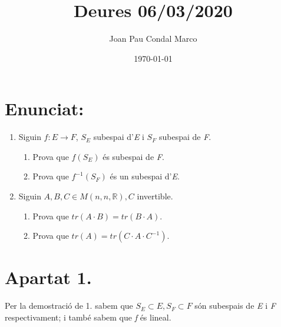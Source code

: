 \documentclass[a4paper, 11pt]{article}
\title{Deures 06/03/2020}
\author{Joan Pau Condal Marco}
\date{\today}
\begin{document}
    \maketitle

    \section*{Enunciat:}
    \begin{enumerate}
        \item Siguin ${f:E\longrightarrow F}$, ${S_E}$ subespai d'\emph{E} i ${S_F}$ subespai de \emph{F}.
        \begin{enumerate}
            \item Prova que ${f(S_E)}$ \'es subespai de \emph{F}.
            \item Prova que ${f^{-1}(S_F)}$ \'es un subespai d'\emph{E}.
        \end{enumerate}
        \item Siguin ${A, B, C \in M(n,n,\mathbb{R}), C}$ invertible.
        \begin{enumerate}
            \item Prova que ${tr(A\cdot B) = tr(B\cdot A)}$.
            \item Prova que ${tr(A) = tr(C\cdot A \cdot C^{-1})}$.
        \end{enumerate}
    \end{enumerate}

    \section*{Apartat 1.}
        Per la demostraci\'o de 1. sabem que ${S_E \subset E, S_F \subset F}$ s\'on subespais de \emph{E} i \emph{F} respectivament; i tamb\'e sabem que \emph{f} \'es lineal.
\end{document}
